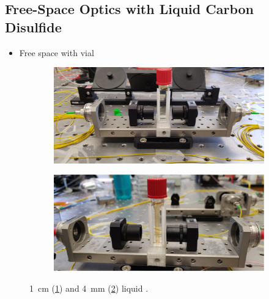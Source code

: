\subsection{Free-Space Optics with Liquid Carbon Disulfide}
\label{subsec:Raman:Target:CS2Vial}

\begin{itemize}
  \item Free space with vial
\end{itemize}

\begin{figure}[t]
    \centering
    \begin{subfigure}[b]{0.49\textwidth}
        \centering
        \includegraphics[width=\textwidth]{figs/4-Raman/1cmCS2.jpeg}
        \caption{}
        \label{fig:Raman:1cmCS2}
    \end{subfigure}
    \hfill
    \begin{subfigure}[b]{0.49\textwidth}
        \centering
        \includegraphics[width=\textwidth]{figs/4-Raman/4mmCS2.jpg}
        \caption{}
        \label{fig:Raman:4mmCS2}
    \end{subfigure}
    \caption{\SI{1}{\centi\meter} (\ref{fig:Raman:1cmCS2}) and \SI{4}{\milli\meter} (\ref{fig:Raman:4mmCS2}) liquid .}
    \label{fig:Raman:CS2Cuvet}
\end{figure}

